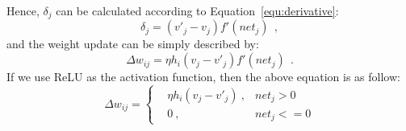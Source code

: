 Hence, $\delta_j$  can be calculated according to Equation~\ref{equ:derivative}:
\begin{equation}
\delta_j = (v'_{j}-v_{j}) f'(net_j)~~,
\end{equation}
and the weight update can be simply described by:
\begin{equation}
\Delta w_{ij} = \eta h_i (v_{j}-v'_{j})  f'(net_j)~~.
\end{equation}
If we use ReLU as the activation function, then the above equation is as follow:
\begin{equation}
\label{equ:ae_widrow_hoff}
\Delta w_{ij} = \left \{
\begin{aligned}
& \eta h_i(v_j - v'_j)~, & net_j > 0 \\
& 0~, & net_j < = 0
\end{aligned} 
\right.
\end{equation}



